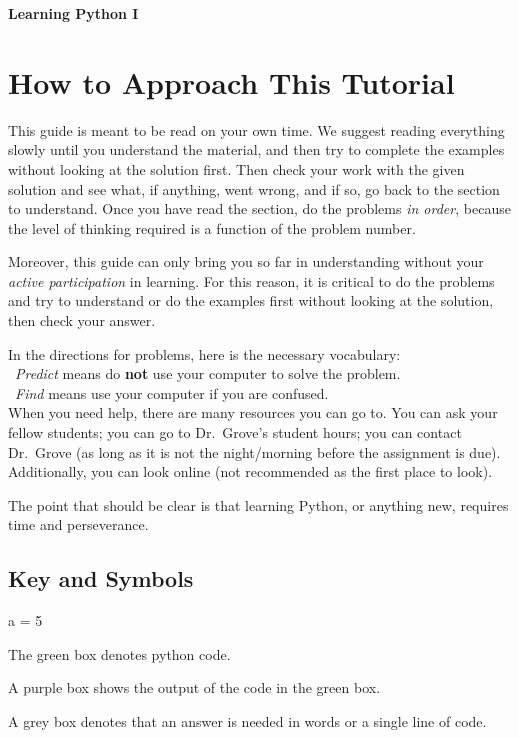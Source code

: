\documentclass{article}
\begin{document}
\begin{center}
{\LARGE\textbf{Learning Python I}}
\end{center}
\vspace{0.5 cm}
\section{How to Approach This Tutorial}
This guide is meant to be read on your own time. We suggest reading everything slowly until you understand the material, and then try to complete the examples without looking at the solution first. Then check your work with the given solution and see what, if anything, went wrong, and if so, go back to the section to understand. Once you have read the section, do the problems \textit{in order}, because the level of thinking required is a function of the problem number. 

Moreover, this guide can only bring you so far in understanding without your \textit{active participation} in learning. For this reason, it is critical to do the problems and try to understand or do the examples first without looking at the solution, then check your answer.

In the directions for problems, here is the necessary vocabulary:\\
\indent \ \textit{Predict} means do \textbf{not} use your computer to solve the problem.\\
\indent \ \textit{Find} means use your computer if you are confused.\\
When you need help, there are many resources you can go to. You can ask your fellow students; you can go to Dr.~Grove's student hours; you can contact Dr.~Grove (as long as it is not the night/morning before the assignment is due). Additionally, you can look online (not recommended as the first place to look).

The point that should be clear is that learning Python, or anything new, requires time and perseverance. 
\subsection{Key and Symbols}
\begin{multicols}{2}
\begin{tcolorbox}[width=.5\textwidth]
	\ttfamily
	a = 5
\end{tcolorbox}
\noindent The green box denotes python code.
\end{multicols}
\begin{multicols}{2}
\begin{tcolorbox}[colback=output, width=.5\textwidth]
	\ttfamily
\end{tcolorbox}
\noindent A purple box shows the output of the code in the green box.
\begin{tcolorbox}[colback=writing, width=.5\textwidth]
	\ttfamily
\end{tcolorbox}
\noindent A grey box denotes that an answer is needed in words or a single line of code.
\end{multicols}
\end{document}

